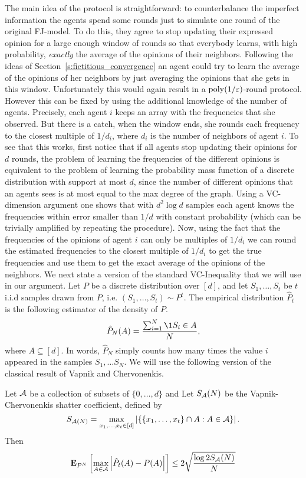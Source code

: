The main idea of the protocol is straightforward: to counterbalance the
imperfect information the agents spend some rounds just to simulate one round
of the original FJ-model. To do this, they agree to stop updating their
expressed opinion for a large enough window of rounds so that everybody learns,
with high probability, \emph{exactly} the average of the opinions of their
neighbors.  Following the ideas of Section~\ref{s:fictitious_convergence} an
agent could try to learn the average of the opinions of her neighbors by just
averaging the opinions that she gets in this window.  Unfortunately this would
again result in a $\mathrm{poly}(1/\varepsilon)$-round protocol.  However this can be fixed by
using the additional knowledge of the number of agents. Precisely, each agent
$i$ keeps an array with the frequencies that she observed. But there is a
catch, when the window ends, she rounds each frequency to the closest multiple
of $1/d_i$, where $d_i$ is the number of neighbors of agent $i$. To see that
this works, first notice that if all agents stop updating their opinions for
$d$ rounds, the problem of learning the frequencies of the different opinions
is equivalent to the problem of learning the probability mass function of a
discrete distribution with support at most $d$, since the number of different
opinions that an agents sees is at most equal to the max degree of the graph.
Using a VC-dimension argument one shows that with $d^2 \log d$ samples each agent
knows the frequencies within error smaller than $1/d$ with constant
probability (which can be trivially amplified by repeating the procedure).
Now, using the fact that the frequencies of the opinions of agent $i$ can
only be multiples of $1/d_i$ we can round the estimated frequencies to the
closest multiple of $1/d_i$ to get the true frequencies and use them to get
the exact average of the opinions of the neighbors.
We next state a version of the standard VC-Inequality that we will use
in our argument.  Let $P$ be a discrete distribution over $[d]$, and let
$S_1, \ldots, S_t$ be $t$ i.i.d samples drawn from $P$, i.e.
$(S_1, \ldots, S_t) \sim P^t$.  The empirical distribution $\hat{P}_t$ is the
following estimator of the density of $P$.
\begin{equation}\label{eq:empirical_distribution}
  \hat{P}_N(A) = \frac{\sum_{i=1}^N \1{S_i \in A}}{N},
\end{equation}
where $A \subseteq [d]$. In words, $\hat{P}_N$ simply counts
how many times the value $i$ appeared in the samples $S_1, \ldots S_N$.
We will use the following version of the classical result of Vapnik and
Chervonenkis.
\begin{lemma}\label{l:vc_inequality}
  Let $\mathcal{A}$ be a collection of subsets of $\{0,\ldots, d\}$ and
  Let $S_{\mathcal{A}}(N)$ be the Vapnik-Chervonenkis shatter coefficient, defined
  by
  \[
    S_{\mathcal{A}(N)} = \max_{x_1,\ldots, x_t \in [d]}
    \left| \{ \{x_1, \ldots, x_t\} \cap A : A \in \mathcal{A} \} \right|.
  \]
  Then
  \[
    \bm{\mathrm{E}}_{P^N} \left[ \max_{A \in \mathcal{A}} \left| \hat{P}_t(A) - P(A) \right| \right]
    \leq 2 \sqrt{\frac{\log{2 S_{\mathcal{A}}(N)}}{N}}
  \]
\end{lemma}

